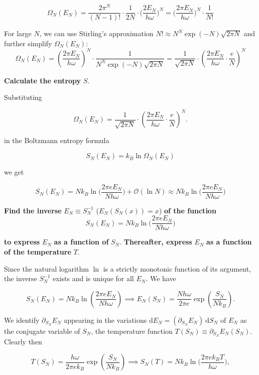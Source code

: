 \documentclass[11pt]{article}
\begin{document}
\[
\Omega_{N} (E_{N}) = \frac{2 \pi^{N}}{(N-1)!} \cdot \frac{1}{2N} \cdot \bigg(\frac{2E_{N}}{h \omega}\bigg)^{N} = \bigg(\frac{2 \pi E_{N}}{h \omega}\bigg)^{N} \cdot \frac{1}{N!}
\]

For large \(N\), we can use Stirling's approximation \(N! \approx N^N \exp(-N) \sqrt{2 \pi N}\) and further simplify \(\Omega_{N} (E_{N})\):
\[
\boxed{
\Omega_{N}(E_N) = \left(\frac{2 \pi E_{N}}{h \omega}\right)^N \cdot \frac{1}{N^N \exp(-N) \sqrt{2 \pi N}} = \frac{1}{\sqrt{2 \pi N}} \cdot \left(\frac{2 \pi E_{N}}{h \omega} \cdot \frac{e}{N}\right)^N
}
\]
\label{sec:orgc549a65}

\textbf{Calculate the entropy} \(S\).

Substituting

\[
\Omega_{N}(E_N) = \frac{1}{\sqrt{2 \pi N}} \cdot \left(\frac{2 \pi E_{N}}{h \omega} \cdot \frac{e}{N}\right)^N.
\]

in the Boltzmann entropy formula

\[
S_{N}(E_{N})=k_{B} \ln \Omega_{N}(E_{N})
\]

we get

\[
\boxed{
S_{N}(E_{N}) = N k_{B} \ln \bigg(\frac{2 \pi e E_{N}}{N h \omega}\bigg) + \mathcal{O} (\ln N) \approx N k_{B} \ln \bigg(\frac{2 \pi e E_{N}}{N h \omega}\bigg)
}
\]
\label{sec:org2a0f958}

\textbf{Find the inverse} \(E_{N} \equiv S_{N}^{-1}\) (\(E_{N}(S_{N}(x)) = x\)) \textbf{of the function}
\[
S_{N}(E_{N}) = N k_{B} \ln \bigg(\frac{2 \pi e E_{N}}{N h \omega}\bigg)
\]

\textbf{to express} \(E_{N}\) \textbf{as a function of} \(S_{N}\). \textbf{Thereafter, express} \(E_{N}\) \textbf{as a function of the temperature} \(T\).

Since the natural logarithm \(\ln\) is a strictly monotonic function of its argument, the inverse \(S_{N}^{-1}\) exists and is unique for all \(E_{N}\). We have

\[
S_{N}(E_N) = N k_B \ln \left( \frac{2 \pi e E_N}{N h \omega} \right) \implies E_{N}(S_{N}) = \frac{N h \omega}{2 \pi e} \exp \left( \frac{S_{N}}{N k_B} \right).
\]

We identify \(\partial_{S_{N}} E_{N}\) appearing in the variations \(\mathrm{d} E_{N} = (\partial_{S_{N}} E_{N})~ \mathrm{d} S_{N}\) of \(E_{N}\) as the conjugate variable of \(S_{N}\), the temperature function \(T(S_{N}) \equiv \partial_{S_{N}} E_{N} (S_{N})\). Clearly then

\[
T(S_{N}) = \frac{h \omega}{2 \pi e k_B} \exp \left( \frac{S_{N}}{N k_B} \right) \implies S_{N} (T) = N k_{B} \ln \bigg(\frac{2 \pi e k_{B} T}{h \omega}\bigg),
\]
\end{document}
